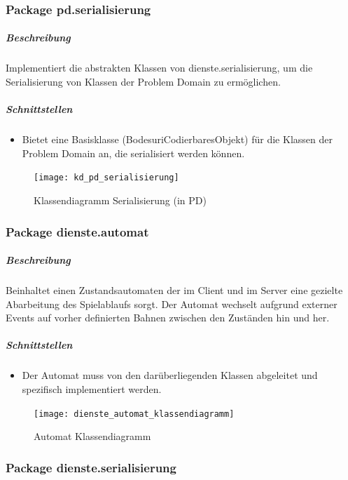 \documentclass[12pt,halfparskip]{scrartcl}
\begin{document}

\clearpage
\subsubsection{Package pd.serialisierung}

\subparagraph{Beschreibung}
Implementiert die abstrakten Klassen von dienste.serialisierung, um die Serialisierung von Klassen der Problem Domain zu ermöglichen.

\subparagraph{Schnittstellen}
\begin{itemize}
	\item Bietet eine Basisklasse (BodesuriCodierbaresObjekt) für die Klassen der Problem Domain an, die serialisiert werden können.
\end{itemize}

\begin{figure}[h]
	\centering
	\texttt{[image: kd\_pd\_serialisierung]}
	\caption{Klassendiagramm Serialisierung (in PD)}
	\label{fig:kd_pd_serialisierung}
\end{figure}

\clearpage
\subsubsection{Package dienste.automat} %
\label{ssub:package_dienste}
\subparagraph{Beschreibung}
Beinhaltet einen Zustandsautomaten der im Client und im Server eine gezielte Abarbeitung
des Spielablaufs sorgt. Der Automat wechselt aufgrund externer Events auf vorher definierten
Bahnen zwischen den Zuständen hin und her.

\subparagraph{Schnittstellen} %
\label{ssub:schnittstellen}
\begin{itemize}
	\item Der Automat muss von den darüberliegenden Klassen abgeleitet und spezifisch implementiert werden.
\end{itemize}	

\begin{figure}[h]
	\centering
	\texttt{[image: dienste\_automat\_klassendiagramm]}
	\caption{Automat Klassendiagramm}
	\label{fig:dienste_serialisierung}
\end{figure}


\clearpage
\subsubsection{Package dienste.serialisierung}
\end{document}
